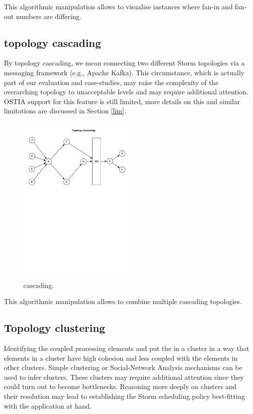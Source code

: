 This algorithmic manipulation allows to visualise instances where fan-in and fan-out numbers are differing.

\subsection{topology cascading}

By topology cascading, we mean connecting two different Storm topologies via a messaging framework (e.g., Apache Kafka). This circumstance, which is actually part of our evaluation and case-studies, may raise the complexity of the overarching topology to unacceptable levels and may require additional attention. OSTIA support for this feature is still limited, more details on this and similar limitations are discussed in Section \ref{lim}.

\begin{figure}[H]
	\begin{center}
		\includegraphics[width=6cm]{images/cascading}
		\caption{cascading.}
		\label{fig:cascading}
	\end{center}
\end{figure}

This algorithmic manipulation allows to combine multiple cascading topologies.

\subsection{Topology clustering}
Identifying the coupled processing elements and put the in a cluster in a way that elements in a cluster have high cohesion and less coupled with the elements in other clusters. Simple clustering or Social-Network Analysis mechanisms can be used to infer clusters. These clusters may require additional attention since they could turn out to become bottlenecks. Reasoning more deeply on clusters and their resolution may lead to establishing the Storm scheduling policy best-fitting with the application at hand.

